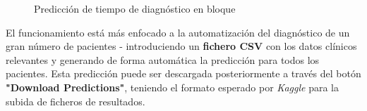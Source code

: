 \begin{figure}[h]
	\vspace{-4mm}
	\centering
	\captionsetup{belowskip=-25pt, justification=centering}
	\caption{Predicción de tiempo de diagnóstico en bloque}
	\label{fig:ch6batch}
\end{figure}

El funcionamiento está más enfocado a la automatización del diagnóstico de un gran número de pacientes - introduciendo un \textbf{fichero CSV} con los datos clínicos relevantes y generando de forma automática la predicción para todos los pacientes. Esta predicción puede ser descargada posteriormente a través del botón \textbf{"Download Predictions"}, teniendo el formato esperado por \textit{Kaggle} para la subida de ficheros de resultados.